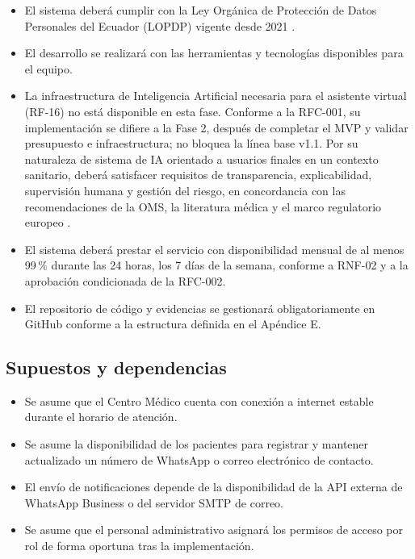 \documentclass[11pt,a4paper]{article}
\providecommand{\tightlist}{%
	\setlength{\itemsep}{0pt}\setlength{\parskip}{0pt}}
\begin{document}
	\begin{itemize}
		\tightlist
		\item
		El sistema deberá cumplir con la Ley Orgánica de Protección de Datos Personales del Ecuador (LOPDP) vigente desde 2021 \cite{loppd}.
		\item
		El desarrollo se realizará con las herramientas y tecnologías disponibles para el equipo.
		\item
		La infraestructura de Inteligencia Artificial necesaria para el asistente virtual (RF-16) no está disponible en esta fase. Conforme a la RFC-001, su implementación se difiere a la Fase 2, después de completar el MVP y validar presupuesto e infraestructura; no bloquea la línea base v1.1. Por su naturaleza de sistema de IA orientado a usuarios finales en un contexto sanitario, deberá satisfacer requisitos de transparencia, explicabilidad, supervisión humana y gestión del riesgo, en concordancia con las recomendaciones de la OMS, la literatura médica y el marco regulatorio europeo \cite{whoai2021,topol2019,rajkomar2019,euaiact2024}.
		\item
		El sistema deberá prestar el servicio con disponibilidad mensual de al menos 99\,\% durante las 24 horas, los 7 días de la semana, conforme a RNF-02 y a la aprobación condicionada de la RFC-002.
		\item
		El repositorio de código y evidencias se gestionará obligatoriamente en GitHub conforme a la estructura definida en el Apéndice E.
	\end{itemize}
	
	\subsection{ Supuestos y dependencias}
	
	\begin{itemize}
		\tightlist
		\item
		Se asume que el Centro Médico cuenta con conexión a internet estable durante el horario de atención.
		\item
		Se asume la disponibilidad de los pacientes para registrar y mantener actualizado un número de WhatsApp o correo electrónico de contacto.
		\item
		El envío de notificaciones depende de la disponibilidad de la API externa de WhatsApp Business o del servidor SMTP de correo.
		\item
		Se asume que el personal administrativo asignará los permisos de acceso por rol de forma oportuna tras la implementación.
	\end{itemize}
	
\end{document}
